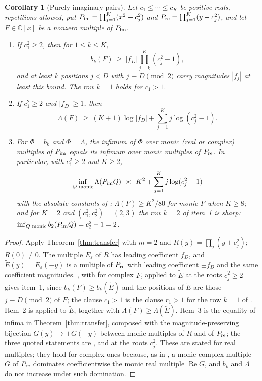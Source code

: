\documentclass[11pt]{article}
\newtheorem{corollary}[theorem]{Corollary}
\begin{document}
\begin{corollary}[Purely imaginary pairs]\label{cor:imag}
Let $c_1\le\cdots\le c_K$ be positive reals, repetitions allowed, put
$P_{\rm im}=\prod_{j=1}^K(x^2+c_j^2)$ and
$P_{\rm re}=\prod_{j=1}^K(y-c_j^2)$, and let $F\in\mathbb C[x]$ be a nonzero
multiple of $P_{\rm im}$.
\begin{enumerate}
\item If $c_1^2\ge2$, then for $1\le k\le K$,
\[
  b_k(F)\ \ge\ |f_D|\prod_{j=k}^K(c_j^2-1),
\]
and at least $k$ positions $j<D$ with $j\equiv D\pmod2$ carry magnitudes
$|f_j|$ at least this bound.
The row $k=1$ holds for $c_1>1$.
\item If $c_1^2\ge2$ and $|f_D|\ge1$, then
\[
  \Lambda(F)\ \ge\ (K+1)\log|f_D|+\sum_{j=1}^Kj\log(c_j^2-1).
\]
\item For $\Phi=b_k$ and $\Phi=\Lambda$, the infimum of $\Phi$ over monic
(real or complex) multiples of $P_{\rm im}$ equals its infimum over monic
multiples of $P_{\rm re}$.  In particular, with $c_1^2\ge2$ and $K\ge2$,
\[
  \inf_{Q\text{ monic}}\Lambda(P_{\rm im}Q)\ \asymp\
  K^2+\sum_{j=1}^Kj\log(c_j^2-1)
\]
with the absolute constants of \cite[Corollary~4.3]{coefficient-mass};
$\Lambda(F)\ge K^2/80$ for monic $F$ when $K\ge8$; and for $K=2$ and
$(c_1^2,c_2^2)=(2,3)$ the row $k=2$ of item~1 is sharp:
$\inf_{Q\text{ monic}}b_2(P_{\rm im}Q)=c_2^2-1=2$.
\end{enumerate}
\end{corollary}

\begin{proof}
Apply Theorem~\ref{thm:transfer} with $m=2$ and $R(y)=\prod_j(y+c_j^2)$;
$R(0)\ne0$.  The multiple $E_\varepsilon$ of $R$ has leading coefficient
$f_D$, and $\tilde E(y)=E_\varepsilon(-y)$ is a multiple of $P_{\rm re}$
with leading coefficient $\pm f_D$ and the same coefficient magnitudes.  \cite[Theorem~3.2]{coefficient-mass}, with \cite[Corollary~3.3]{coefficient-mass} for complex $F$, applied to
$\tilde E$ at the roots $c_j^2\ge2$ gives item~1, since
$b_k(F)\ge b_k(\tilde E)$ and the positions of $\tilde E$ are those
$j\equiv D\pmod 2$ of $F$; the clause $c_1>1$ is the clause $r_1>1$ for the row $k=1$ of
\cite[Theorem~3.2]{coefficient-mass}.  Item~2 is \cite[Corollary~3.4]{coefficient-mass} applied to $\tilde E$, together with
$\Lambda(F)\ge\Lambda(\tilde E)$.  Item~3 is the equality of infima in
Theorem~\ref{thm:transfer}, composed with the magnitude-preserving
bijection $G(y)\mapsto\pm G(-y)$ between monic multiples of $R$ and of
$P_{\rm re}$; the three quoted statements are \cite[Corollary~4.3]{coefficient-mass},
\cite[Proposition~4.2]{coefficient-mass} and \cite[Proposition~4.4]{coefficient-mass} at
the roots $c_j^2$.  These are stated for real multiples; they hold for complex
ones because, as in \cite[Corollary~3.3]{coefficient-mass}, a monic complex
multiple $G$ of $P_{\rm re}$ dominates coefficientwise the monic real multiple
$\operatorname{Re}G$, and $b_k$ and $\Lambda$ do not increase under such
domination.
\end{proof}
\end{document}
